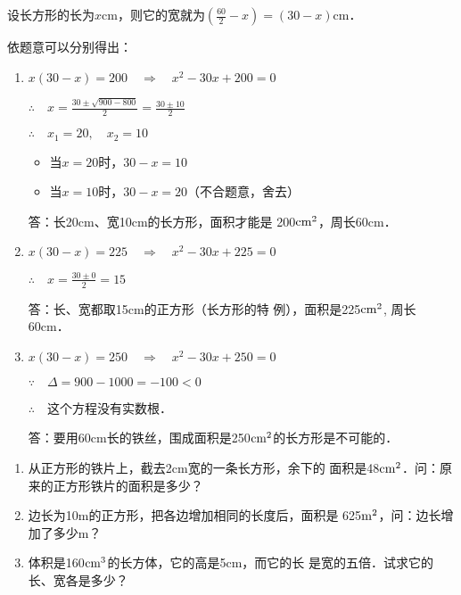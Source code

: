 \begin{figure}[htp]
    \centering
    \caption{}
\end{figure}

\begin{solution}
    设长方形的长为$x$cm，则它的宽就为$\left(\frac{60}{2}-x\right)=(30-x)$cm．

    依题意可以分别得出：
\begin{enumerate}
    \item $x(30-x)=200\quad \Rightarrow\quad x^2-30x+200=0$

    $\therefore\quad x=\frac{30\pm \sqrt{900-800}}{2}=\frac{30\pm 10}{2}$

    $\therefore\quad x_1=20,\quad x_2=10$
\begin{itemize}
    \item 当$x=20$时，$30-x=10$
    \item 当$x=10$时，$30-x=20$（不合题意，舍去）
\end{itemize}

答：长20cm、宽10cm的长方形，面积才能是
200${\rm cm}^2$，周长60cm．

\item $x(30-x)=225\quad \Rightarrow\quad x^2-30x+225=0$

$\therefore\quad x=\frac{30\pm 0}{2}=15$

答：长、宽都取15cm的正方形（长方形的特
例），面积是225${\rm cm}^2$, 周长60cm．

\item $x(30-x)=250\quad \Rightarrow\quad x^2-30x+250=0$

$\because\quad \Delta =900-1000=-100<0$

$\therefore\quad $这个方程没有实数根．

答：要用60cm长的铁丝，围成面积是250${\rm cm}^2$的长方形是不可能的．
\end{enumerate}
\end{solution}

\begin{ex}
\begin{enumerate}
    \item 从正方形的铁片上，截去2cm宽的一条长方形，余下的
    面积是48${\rm cm}^2$．问：原来的正方形铁片的面积是多少？

    \item 边长为10m的正方形，把各边增加相同的长度后，面积是
625${\rm m}^2$，问：边长增加了多少m？
\item 体积是160${\rm cm}^3$的长方体，它的高是5cm，而它的长
是宽的五倍．试求它的长、宽各是多少？
\end{enumerate}
    
\end{ex}



